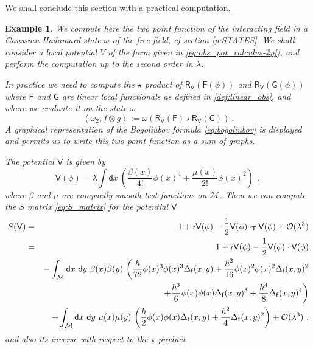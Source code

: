 \documentclass[11pt]{book}
\newcommand{\sm}[1]{\left\langle#1\right\rangle}
\newcommand{\Mcal}{\mathcal{M}}
\newcommand{\Ocal}{\mathcal{O}}
\newcommand{\Fsf}{\mathsf{F}}
\newcommand{\Gsf}{\mathsf{G}}
\newcommand{\Rsf}{\mathsf{R}}
\newcommand{\Tsf}{\mathsf{T}}
\newcommand{\Vsf}{\mathsf{V}}
\newcommand{\dsf}{\mathsf{d}}
\newcommand{\fsf}{\mathsf{f}}
\theoremstyle{break}
\newtheorem{example}{Example}[chapter]
\begin{document}
We shall conclude this section with a practical computation.


\begin{example}
We compute here the two point function of the interacting field in a Gaussian Hadamard state $\omega$ of the free field, cf section \ref{p:STATES}. We shall consider a local potential $V$ of the form given in \eqref{eq:obs_pot_calculus-2pf}, and perform the computation up to the second order in $\lambda$. \par
%
%
In practice we need to compute the $\star$ product of $\Rsf_\Vsf(\Fsf(\phi))$ and $\Rsf_\Vsf(\Gsf(\phi))$ where $\Fsf$ and $\Gsf$ are linear local functionals as defined in \ref{def:linear_obs}, and where we evaluate it on the state $\omega$
%
\begin{equation*}
\sm{ \omega_2, f \otimes g } := \omega(\Rsf_\Vsf(\Fsf) \star \Rsf_\Vsf(\Gsf)) \ .
\end{equation*}
%
%
A graphical representation of the Bogoliubov formula \eqref{eq:bogoliubov} is displayed and permits us to write this two point function as a sum of graphs.\par
%
%
The potential $\Vsf$ is given by
%
\begin{equation}
\Vsf(\phi) = \lambda \int \dsf x \ \left( \frac{\beta(x)}{4!}\phi(x)^4  + \frac{\mu(x)}{2!}\phi(x)^2 \right) \ \ ,
\label{eq:obs_pot_calculus-2pf}
\end{equation}
%
where $\beta$ and $\mu$ are compactly smooth test functions on $\Mcal$. Then we can compute the $S$ matrix \eqref{eq:S_matrix} for the potential $\Vsf$
%
\begin{eqnarray*}
S(\Vsf) &=& 1 + i \Vsf(\phi) - \frac{1}{2} \Vsf(\phi) \cdot_\Tsf \Vsf(\phi) + \Ocal(\lambda^3) \\
&=&  \ 1 + i \Vsf(\phi) - \frac{1}{2} \Vsf(\phi) \cdot \Vsf(\phi) \\
&& - \int_\Mcal \dsf x \ \dsf y \ \beta(x) \beta(y) \ \bigg( 
\frac{\hbar}{72} \phi(x)^3 \phi(x)^3 \Delta_\fsf(x,y) + \frac{\hbar^2}{16} \phi(x)^2 \phi(x)^2 \Delta_\fsf(x,y)^2 \\ 
&& \hspace*{13pt} + \frac{\hbar^3}{6} \phi(x) \phi(x) \Delta_\fsf(x,y)^3 + \frac{\hbar^4}{8} \Delta_\fsf(x,y)^4 \bigg) \\
&& + \int_\Mcal \dsf x \ \dsf y \ \mu(x) \mu(y) \ \bigg( 
\frac{\hbar}{2} \phi(x) \phi(x) \Delta_\fsf(x,y) + \frac{\hbar^2}{4} \Delta_\fsf(x,y)^2 \bigg) + \Ocal(\lambda^3) \ , 
\end{eqnarray*}
%
and also its inverse with respect to the $\star$ product

\end{example}
\end{document}
